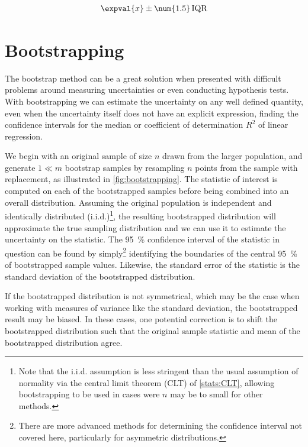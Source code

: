 \begin{equation}\label{eq:stats:outlier_IQR_def}
\expval{x} \pm \num{1.5}\, \text{IQR}
\end{equation}

\section{Bootstrapping}
\label{stats:bootstrapping}

The bootstrap method can be a great solution when presented with difficult problems
around measuring uncertainties or even conducting hypothesis tests.
With bootstrapping we can estimate the uncertainty on any well defined quantity,
even when the uncertainty itself does not have an explicit expression,
\eg finding the confidence intervals for the median
or coefficient of determination $R^{2}$ of linear regression.

We begin with an original sample of size $n$ drawn from the larger population,
and generate $1 \ll m$ bootstrap samples by resampling $n$ points from the sample with replacement,
as illustrated in \cref{fig:bootstrapping}.
The statistic of interest is computed on each of the bootstrapped samples
before being combined into an overall distribution.
Assuming the original population is independent and identically distributed (i.i.d.)\footnote{Note
that the i.i.d. assumption is less stringent than
the usual assumption of normality via the central limit theorem (CLT) of \cref{stats:CLT},
allowing bootstrapping to be used in cases were $n$ may be to small for other methods.},
the resulting bootstrapped distribution will approximate the true sampling distribution
and we can use it to estimate the uncertainty on the statistic.
The \SI{95}{\percent} confidence interval of the statistic in question
can be found by simply\footnote{There are
more advanced methods for determining the confidence interval not covered here,
particularly for asymmetric distributions.} identifying
the boundaries of the central \SI{95}{\percent} of bootstrapped sample values.
Likewise, the standard error of the statistic is the standard deviation of the bootstrapped distribution.

If the bootstrapped distribution is not symmetrical,
which may be the case when working with measures of variance like the standard deviation,
the bootstrapped result may be biased.
In these cases, one potential correction is to shift the bootstrapped distribution
such that the original sample statistic and mean of the bootstrapped distribution agree.

